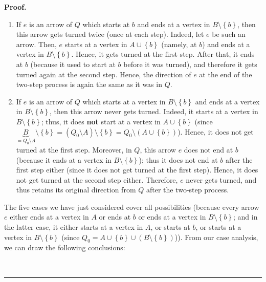 \documentclass[numbers=enddot,12pt,final,onecolumn,notitlepage]{scrartcl}%
\numberwithin{exer}{section}
\theoremstyle{definition}
\newenvironment{proof}[1][Proof]{\noindent\textbf{#1.} }{\ \rule{0.5em}{0.5em}}
\begin{document}
\begin{proof}
{\begin{enumerate}
started at a vertex in $A$), and so it does not end at $b$ (because $b\notin
A$). Therefore, it does not turn at the second step; hence, it has turned
exactly once altogether. Its direction is therefore reversed at the end of the
process.
\par
\item If $e$ is an arrow of $Q$ which starts at $b$ and ends at a vertex in
$B\setminus\left\{  b\right\}  $, then this arrow gets turned twice (once at
each step). Indeed, let $e$ be such an arrow. Then, $e$ starts at a vertex in
$A\cup\left\{  b\right\}  $ (namely, at $b$) and ends at a vertex in
$B\setminus\left\{  b\right\}  $. Hence, it gets turned at the first step.
After that, it ends at $b$ (because it used to start at $b$ before it was
turned), and therefore it gets turned again at the second step. Hence, the
direction of $e$ at the end of the two-step process is again the same as it
was in $Q$.
\par
\item If $e$ is an arrow of $Q$ which starts at a vertex in $B\setminus
\left\{  b\right\}  $ and ends at a vertex in $B\setminus\left\{  b\right\}
$, then this arrow never gets turned. Indeed, it starts at a vertex in
$B\setminus\left\{  b\right\}  $; thus, it does \textbf{not} start at a vertex
in $A\cup\left\{  b\right\}  $ (since $\underbrace{B}_{=Q_{0}\setminus
A}\setminus\left\{  b\right\}  =\left(  Q_{0}\setminus A\right)
\setminus\left\{  b\right\}  =Q_{0}\setminus\left(  A\cup\left\{  b\right\}
\right)  $). Hence, it does not get turned at the first step. Moreover, in
$Q$, this arrow $e$ does not end at $b$ (because it ends at a vertex in
$B\setminus\left\{  b\right\}  $); thus it does not end at $b$ after the first
step either (since it does not get turned at the first step). Hence, it does
not get turned at the second step either. Therefore, $e$ never gets turned,
and thus retains its original direction from $Q$ after the two-step process.
\end{enumerate}
\par
The five cases we have just considered cover all possibilities (because every
arrow $e$ either ends at a vertex in $A$ or ends at $b$ or ends at a vertex in
$B\setminus\left\{  b\right\}  $; and in the latter case, it either starts at
a vertex in $A$, or starts at $b$, or starts at a vertex in $B\setminus
\left\{  b\right\}  $ (since $Q_{0}=A\cup\left\{  b\right\}  \cup\left(
B\setminus\left\{  b\right\}  \right)  $)). From our case analysis, we can
draw the following conclusions:
\par
}
\end{proof}
\end{document}
